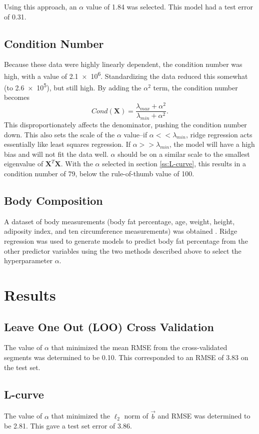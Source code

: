 \documentclass{IEEEtran}
\begin{document}
Using this approach, an $\alpha$ value of \num{1.84} was selected. This model had a test error of \num{0.31}.

\subsection{Condition Number}
Because these data were highly linearly dependent, the condition number was high, with a value of 
\num{2.1e6}. Standardizing the data reduced this somewhat (to \num{2.6e5}), but still high. By adding the 
$\alpha^2$ term, the condition number becomes $$ Cond(\mathbf{X} ) = \frac{\lambda_{max} + \alpha^2}
{\lambda_{min} + \alpha^2}. $$ This disproportionately affects the denominator, pushing the condition number 
down. This also sets the scale of the $\alpha$ value--if $\alpha << \lambda_{min}$, ridge regression acts 
essentially like least squares regression. If $\alpha >> \lambda_{min}$, the model will have a high bias 
and will not fit the data well. $\alpha$ should be on a similar scale to the smallest eigenvalue of 
$\mathbf{X}^T \mathbf{X}$. With the $\alpha$ selected in section \ref{ss:L-curve}, this results in a 
condition number of \num{79}, below the rule-of-thumb value of \num{100}.

\subsection{Body Composition}
A dataset of body measurements (body fat percentage, age, weight, height, adiposity index, and ten 
circumference measurements) was obtained \cite{Penrose1985}. Ridge regression was used to generate models to 
predict body fat percentage from the other predictor variables using the two methods described above to select 
the hyperparameter $\alpha$.

\section{Results}

\subsection{Leave One Out (LOO) Cross Validation}
The value of $\alpha$ that minimized the mean RMSE from the cross-validated segments was determined to be 
\num{0.10}. This corresponded to an RMSE of \num{3.83} on the test set.

\subsection{L-curve} \label{ss:Results L-Curve}
The value of $\alpha$ that minimized the $\ell_2$ norm of $\vec{b}$ and RMSE was determined to be \num{2.81}. 
This gave a test set error of \num{3.86}.
\end{document}
